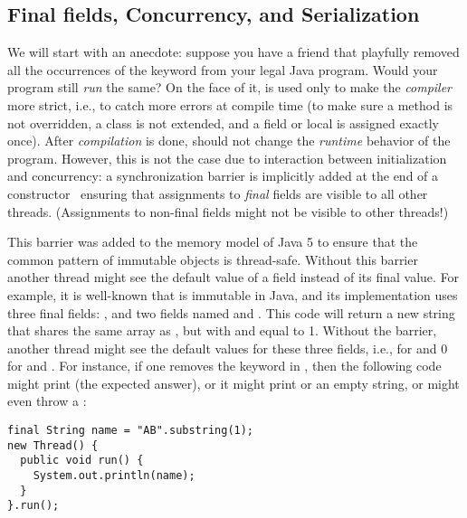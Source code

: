 \subsection{Final fields, Concurrency, and Serialization}
\label{Section:FinalFields}
We will start with an anecdote:
    suppose you have a friend that
    playfully removed all the occurrences of the  keyword
    from your legal Java program.
Would your program still \emph{run} the same?
On the face of it,  is used only to make the \emph{compiler} more {strict},
    i.e., to catch more errors at compile time
    (to make sure a method is not overridden, a class is not extended, and a field or local
        is assigned exactly once).
After \emph{compilation} is done,  should not change the \emph{runtime} behavior of the program.
However, this is not the case due to interaction between initialization and concurrency:
    a synchronization barrier is implicitly added
    at the end of a constructor~\cite{JSR133}
    ensuring that assignments to \emph{final} fields are visible to all other threads.
(Assignments to non-final fields might not be visible to other threads!)

This barrier was added to the memory model of Java 5
    to ensure that the common pattern of immutable objects is thread-safe.
Without this barrier another thread might see the default value of a field
    instead of its final value.
For example, it is well-known that  is immutable in Java,
    and its implementation uses three {final} fields:
    , and two  fields named  and .
This code  will return a new string 
    that shares
    the same  array as , %
    but with  and  equal to 1.
Without the barrier, %
    another thread might see the default values for these three fields,
    i.e.,  for  and 0 for  and .
For instance,
    if one removes the  keyword in ,
    then
    the following code might print  (the expected answer),
    or it might print
     or an empty string,
    or might even throw a :
\begin{lstlisting}
final String name = "AB".substring(1);
new Thread() {
  public void run() {
    System.out.println(name);
  }
}.run();
\end{lstlisting}


